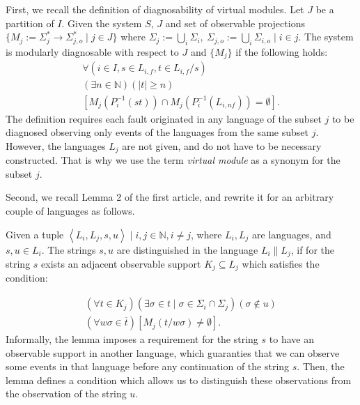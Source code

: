 \documentclass[a4paper, 10pt, conference]{ieeeconf}
\begin{document}
First, we recall the definition of diagnosability of virtual modules. Let $J$ be
a partition of $I$. Given the system $S$, $J$ and set of observable
projections $\{M_j := \Sigma_j^* \rightarrow \Sigma_{j,o}^* \mid j \in J \}$
where $\Sigma_j := \bigcup_i \Sigma_i,~ 
	\Sigma_{j,o} := \bigcup_i \Sigma_{i,o} \mid 
	i\in j$. 
The system is modularly diagnosable with respect to $J$ and $\{M_j\}$ 
if the following holds:
\begin{equation}
	\begin{array}{l}
		\forall(i \in I, s \in L_{i,f}, t \in L_{i,f}/s)
		\\
		(\exists n \in \mathbb{N})
		(|t| \geq n)
		\\
		\left[ M_j(P_i^{-1}(st)) \cap M_j(P_i^{-1}(L_{i,nf})) = \emptyset \right].
	\end{array}
\end{equation}
The definition requires each fault originated in any language of the subset $j$
to be diagnosed observing only events of the languages from the same subset $j$.
However, the languages $L_j$ are not given, and do not have to be necessary
constructed. That is why we use the term \emph{virtual module} as a synonym for
the subset $j$.

Second, we recall Lemma 2 of the first article, and rewrite it for an arbitrary
couple of languages as follows.

\begin{lemma}
Given a tuple $\left< L_i, L_j, s, u\right> \mid i, j \in \mathbb{N}, i\neq j$,
where $L_i, L_j$ are languages, and $s, u \in L_i$. The strings $s, u$ are
distinguished in the language $L_i \parallel L_j$, if for the string $s$ exists
an adjacent observable support $K_j \subseteq L_j$ which satisfies the
condition:
\end{lemma} 
\begin{equation}
\label{con:distinquished}
	\begin{array}{l}
	 	(\forall t \in K_j)
	 	(\exists \sigma \in t \mid \sigma \in \Sigma_i \cap \Sigma_j)
	 	(\sigma \not \in u)
	 	\\
	 	(\forall w\sigma \in \overline{t})
	 	[M_j(t / w\sigma) \neq \emptyset].
	\end{array}
\end{equation}
Informally, the lemma imposes a requirement for the string $s$ to have an
observable support in another language, which guaranties that we can observe some
events in that language before any continuation of the string $s$.
Then, the lemma defines a condition which allows us to distinguish these
observations from the observation of the string $u$.
\end{document}

